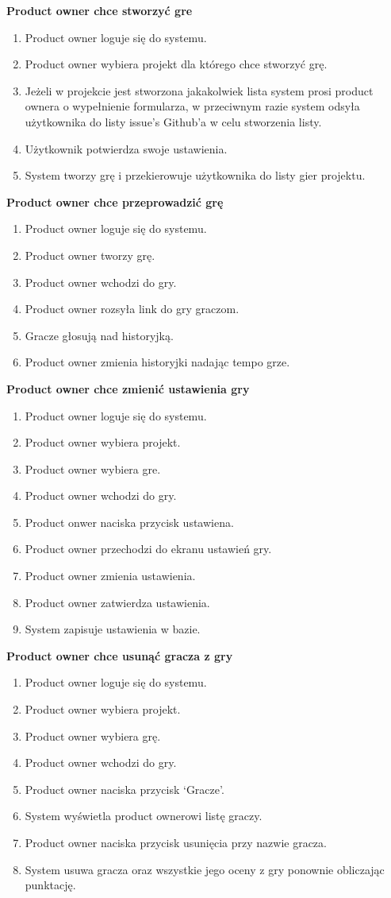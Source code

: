 \textbf{Product owner chce stworzyć gre}
\begin{enumerate}
    \item Product owner loguje się do systemu.
    \item Product owner wybiera projekt dla którego chce stworzyć grę.
    \item Jeżeli w projekcie jest stworzona jakakolwiek lista system prosi product ownera o wypełnienie formularza,
    w przeciwnym razie system odsyła użytkownika do listy issue's Github'a w celu stworzenia listy.
    \item Użytkownik potwierdza swoje ustawienia.
    \item System tworzy grę i przekierowuje użytkownika do listy gier projektu.
\end{enumerate}
\textbf{Product owner chce przeprowadzić grę}
\begin{enumerate}
    \item Product owner loguje się do systemu.
    \item Product owner tworzy grę.
    \item Product owner wchodzi do gry.
    \item Product owner rozsyła link do gry graczom.
    \item Gracze głosują nad historyjką.
    \item Product owner zmienia historyjki nadając tempo grze.
\end{enumerate}
\textbf{Product owner chce zmienić ustawienia gry}
\begin{enumerate}
    \item Product owner loguje się do systemu.
    \item Product owner wybiera projekt.
    \item Product owner wybiera gre.
    \item Product owner wchodzi do gry.
    \item Product onwer naciska przycisk ustawiena.
    \item Product owner przechodzi do ekranu ustawień gry.
    \item Product owner zmienia ustawienia.
    \item Product owner zatwierdza ustawienia.
    \item System zapisuje ustawienia w bazie.
\end{enumerate}
\textbf{Product owner chce usunąć gracza z gry}
\begin{enumerate}
    \item Product owner loguje się do systemu.
    \item Product owner wybiera projekt.
    \item Product owner wybiera grę.
    \item Product owner wchodzi do gry.
    \item Product owner naciska przycisk `Gracze'.
    \item System wyświetla product ownerowi listę graczy.
    \item Product owner naciska przycisk usunięcia przy nazwie gracza.
    \item System usuwa gracza oraz wszystkie jego oceny z gry ponownie obliczając punktację.
\end{enumerate}
